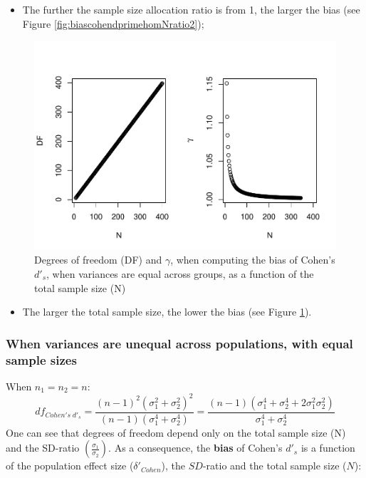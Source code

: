 \documentclass[
  man]{apa6}
\providecommand{\tightlist}{%
  \setlength{\itemsep}{0pt}\setlength{\parskip}{0pt}}
\begin{document}
\begin{itemize}
\tightlist
\item
  The further the sample size allocation ratio is from 1, the larger the bias (see Figure \ref{fig:biascohendprimehomNratio2});
\end{itemize}

\begin{figure}
\centering
\includegraphics{Theoretical-Bias-of-all-estimators-as-a-function-of-population-parameters_files/figure-latex/biascohendprimehomNsize2-1.pdf}
\caption{\label{fig:biascohendprimehomNsize2}Degrees of freedom (DF) and \(\gamma\), when computing the bias of Cohen's \(d'_s\), when variances are equal across groups, as a function of the total sample size (N)}
\end{figure}

\begin{itemize}
\tightlist
\item
  The larger the total sample size, the lower the bias (see Figure \ref{fig:biascohendprimehomNsize2}).
\end{itemize}

\hypertarget{when-variances-are-unequal-across-populations-with-equal-sample-sizes}{%
\subsubsection{When variances are unequal across populations, with equal sample sizes}\label{when-variances-are-unequal-across-populations-with-equal-sample-sizes}}

When \(n_1=n_2=n\):
\[df_{Cohen's \; d'_s} = \frac{(n-1)^2(\sigma^2_1+\sigma^2_2)^2}{(n-1)(\sigma^4_1+\sigma^4_2)} =  \frac{(n-1)(\sigma^4_1+\sigma^4_2+2\sigma^2_1\sigma^2_2)}{\sigma^4_1+\sigma^4_2}\]
One can see that degrees of freedom depend only on the total sample size (N) and the SD-ratio \(\left(\frac{\sigma_1}{\sigma_2} \right)\). As a consequence, the \textbf{bias} of Cohen's \(d'_s\) is a function of the population effect size (\(\delta'_{Cohen}\)), the \(SD\)-ratio and the total sample size (\(N\)):
\end{document}
